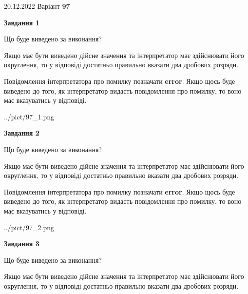 \documentclass[12pt, ukrainian]{article}
\begin{document}
{20.12.2022 Варіант \No \textbf { 97 }\par}
{
\begin {Large}

{\begin {center}\textbf{Завдання 1}\end {center}}\par
Що буде виведено за виконання? \par

Якщо має бути виведено дійсне значення та інтерпретатор має здійснювати його округлення, 
то у відповіді достатньо правильно вказати два дробових розряди.

Повідомлення інтерпретатора про помилку позначати \textbf{error}.
Якщо щось буде виведено до того, як інтерпретатор видасть повідомлення про помилку, 
то воно має вказуватись у відповіді. \par

\begin{center}
	{../pict/97_1.png}
\end{center}
\newpage

{\begin {center}\textbf{Завдання 2}\end {center}}\par
Що буде виведено за виконання? \par

Якщо має бути виведено дійсне значення та інтерпретатор має здійснювати його округлення, 
то у відповіді достатньо правильно вказати два дробових розряди.

Повідомлення інтерпретатора про помилку позначати \textbf{error}.
Якщо щось буде виведено до того, як інтерпретатор видасть повідомлення про помилку, 
то воно має вказуватись у відповіді. \par

\begin{center}
	{../pict/97_2.png}
\end{center}
\newpage

{\begin {center}\textbf{Завдання 3}\end {center}}\par
Що буде виведено за виконання? \par

Якщо має бути виведено дійсне значення та інтерпретатор має здійснювати його округлення, 
то у відповіді достатньо правильно вказати два дробових розряди.


\end{Large}}
\end{document}
